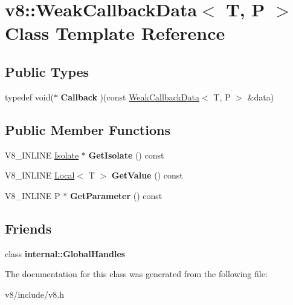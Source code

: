 \hypertarget{classv8_1_1WeakCallbackData}{\section{v8\-:\-:Weak\-Callback\-Data$<$ T, P $>$ Class Template Reference}
\label{classv8_1_1WeakCallbackData}
}
\subsection*{Public Types}
\begin{DoxyCompactItemize}
\item 
\hypertarget{classv8_1_1WeakCallbackData_a8edecc5e650937a3501a471f0c557692}{typedef void($\ast$ {\bfseries Callback} )(const \hyperlink{classv8_1_1WeakCallbackData}{Weak\-Callback\-Data}$<$ T, P $>$ \&data)}\label{classv8_1_1WeakCallbackData_a8edecc5e650937a3501a471f0c557692}

\end{DoxyCompactItemize}
\subsection*{Public Member Functions}
\begin{DoxyCompactItemize}
\item 
\hypertarget{classv8_1_1WeakCallbackData_a499a971756182b5b52c28e506339c6b9}{V8\-\_\-\-I\-N\-L\-I\-N\-E \hyperlink{classv8_1_1Isolate}{Isolate} $\ast$ {\bfseries Get\-Isolate} () const }\label{classv8_1_1WeakCallbackData_a499a971756182b5b52c28e506339c6b9}

\item 
\hypertarget{classv8_1_1WeakCallbackData_a0e8fcf0091132c96d548ac319284710a}{V8\-\_\-\-I\-N\-L\-I\-N\-E \hyperlink{classv8_1_1Local}{Local}$<$ T $>$ {\bfseries Get\-Value} () const }\label{classv8_1_1WeakCallbackData_a0e8fcf0091132c96d548ac319284710a}

\item 
\hypertarget{classv8_1_1WeakCallbackData_a96ce7e1fbbfd56d0709225623517ff17}{V8\-\_\-\-I\-N\-L\-I\-N\-E P $\ast$ {\bfseries Get\-Parameter} () const }\label{classv8_1_1WeakCallbackData_a96ce7e1fbbfd56d0709225623517ff17}

\end{DoxyCompactItemize}
\subsection*{Friends}
\begin{DoxyCompactItemize}
\item 
\hypertarget{classv8_1_1WeakCallbackData_af107d8c7663669a5fd39ab41cf5ead03}{class {\bfseries internal\-::\-Global\-Handles}}\label{classv8_1_1WeakCallbackData_af107d8c7663669a5fd39ab41cf5ead03}

\end{DoxyCompactItemize}


The documentation for this class was generated from the following file\-:\begin{DoxyCompactItemize}
\item 
v8/include/v8.\-h\end{DoxyCompactItemize}
